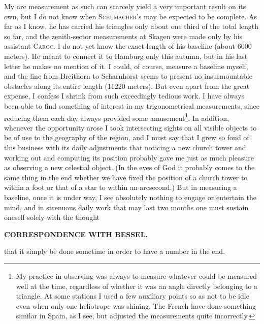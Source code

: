 \par\noindent\hspace*{\parindent}My arc measurement as such can scarcely yield a very important result on its own, but I do not know when \textsc{Schumacher}'s may be expected to be complete.
As far as I know, he has carried his triangles only about one third of the total length so far, and the zenith-sector measurements at Skagen were made only by his assistant \textsc{Caroc}.
I do not yet know the exact length of his baseline (about 6000 meters). He meant to connect it to Hamburg only this autumn, but in his last letter he makes no mention of it.
I could, of course, measure a baseline myself, and the line from Breithorn to Scharnhorst seems to present no insurmountable obstacles along its entire length (11220 meters).
But even apart from the great expense, I confess I shrink from such exceedingly tedious work.
I have always been able to find something of interest in my trigonometrical measurements, since reducing them each day always provided some amusement\footnote{My practice in observing was always to measure whatever could be measured well at the time, regardless of whether it was an angle directly belonging to a triangle. At some stations I used a few auxiliary points so as not to be idle even when only one heliotrope was shining. The French have done something similar in Spain, as I see, but adjusted the measurements quite incorrectly.}.
In addition, whenever the opportunity arose I took intersecting sights on all visible objects to be of use to the geography of the region, and I must say that I grew so fond of this business with its daily adjustments that noticing a new church tower and working out and computing its position probably gave me just as much pleasure as observing a new celestial object.
(In the eyes of God it probably comes to the same thing in the end whether we have fixed the position of a church tower to within a foot or that of a star to within an arcsecond.)
But in measuring a baseline, once it is under way, I see absolutely nothing to engage or entertain the mind, and in strenuous daily work that may last two months one must sustain oneself solely with the thought
\par\clearpage
{}\hfill{\small\textbf{CORRESPONDENCE WITH BESSEL.}}\par\medskip
\noindent that it simply  be done sometime in order to have a number in the end.

